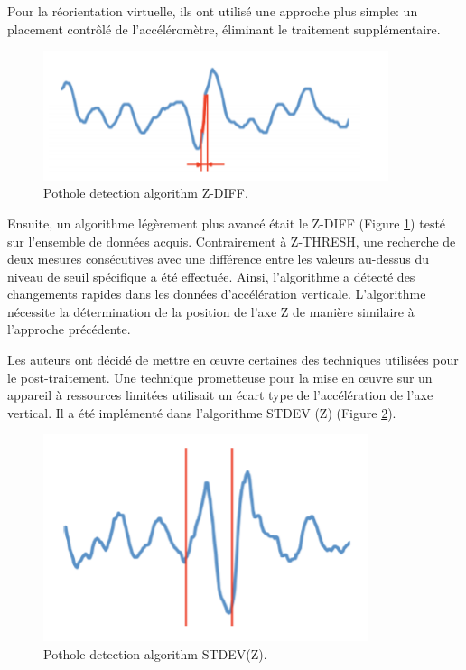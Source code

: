 Pour la réorientation virtuelle, ils ont utilisé une approche plus simple: un placement contrôlé de l'accéléromètre, éliminant le traitement supplémentaire.

\begin{figure}[h!]
  \center
  \includegraphics[width=0.9\textwidth]{Images/chapter2/relatedWork4.PNG}
  \caption{Pothole detection algorithm Z-DIFF.}
  \label{fig:graph_Z_DIFF}
\end{figure}

Ensuite, un algorithme légèrement plus avancé était le Z-DIFF (Figure \ref{fig:graph_Z_DIFF}) testé sur l'ensemble de données acquis. Contrairement à Z-THRESH, une recherche de deux mesures consécutives avec une différence entre les valeurs au-dessus du niveau de seuil spécifique a été effectuée. Ainsi, l'algorithme a détecté des changements rapides dans les données d'accélération verticale. L'algorithme nécessite la détermination de la position de l'axe Z de manière similaire à l'approche précédente. 


Les auteurs ont décidé de mettre en œuvre certaines des techniques utilisées pour le post-traitement. Une technique prometteuse pour la mise en œuvre sur un appareil à ressources limitées utilisait un écart type de l'accélération de l'axe vertical. Il a été implémenté dans l'algorithme STDEV (Z) (Figure \ref{fig:graph_STDEV_z}).

\begin{figure}[h!]
  \center
  \includegraphics[width=0.85\textwidth]{Images/chapter2/relatedWork5.PNG}
  \caption{Pothole detection algorithm STDEV(Z).}
  \label{fig:graph_STDEV_z}
\end{figure}

